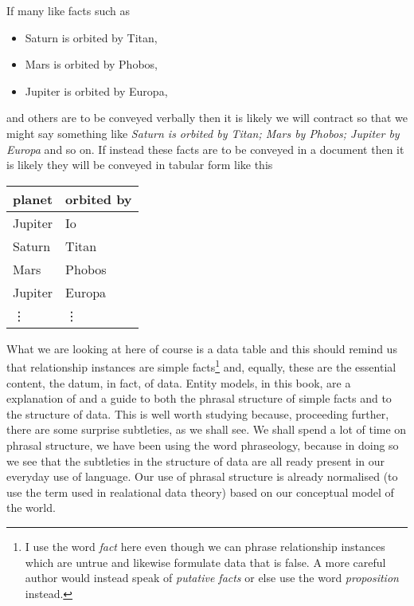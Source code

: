 If many like facts such as
\begin{itemize}
\renewcommand\labelitemi{--} 
\item Saturn is orbited by Titan, 
\item Mars is orbited by Phobos, 
\item Jupiter is orbited by Europa,
\end{itemize}
and others are to be conveyed verbally then it is likely we will contract so that we might say something like
\textit{Saturn is orbited by Titan; Mars by Phobos; Jupiter by Europa} and so on.
If instead  these facts are to be conveyed in a document then
it is likely they will be conveyed in tabular form like this
\begin{center}
\begin{tabular}{|l | l|}
\hline
planet & orbited by \\
\hline\hline
Jupiter  & Io \\
\hline
Saturn   & Titan    \\
\hline
Mars     & Phobos    \\
\hline
Jupiter  & Europa         \\
\hline
\vdots    & \vdots  \\
\hline
\end{tabular}
\end{center}

What we are looking at here of course is a data table and 
this should remind us that relationship instances 
are simple facts\footnote{I use the word \textit{fact} here even though
we can phrase relationship instances which are untrue and likewise
formulate data that is false. 
A more careful author would instead speak of \textit{putative facts} or else
use the word \textit{proposition} instead.} 
and, equally, these are the  essential content, the datum, in fact,  of data. 
Entity models, in this book, are a explanation of and a guide to both the phrasal structure of simple facts and to the structure of data. 
This is well worth studying because, proceeding further, there are some surprise subtleties, as we shall see. We shall spend a lot of time on phrasal structure,
we have been using the word phraseology, because in doing so we see that the subtleties in the structure of data are all ready present in our everyday use of language. Our use of phrasal structure is already normalised (to use the term used in realational data theory) based on our conceptual model of the world.
